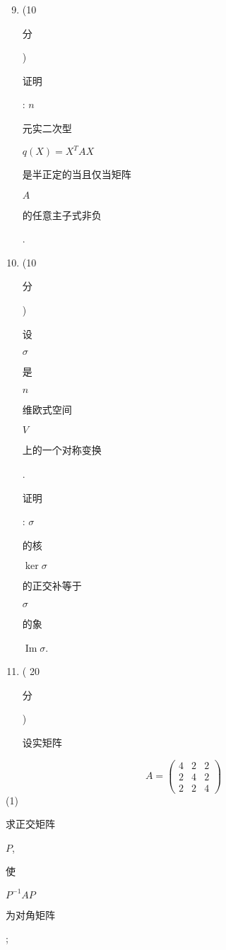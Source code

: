 \documentclass[10pt]{article}
\begin{document}
\begin{enumerate}
  \setcounter{enumi}{8}
  \item (10 \begin{CJK}{UTF8}{mj}分\end{CJK}) \begin{CJK}{UTF8}{mj}证明\end{CJK}: $n$ \begin{CJK}{UTF8}{mj}元实二次型\end{CJK} $q(X)=X^{T} A X$ \begin{CJK}{UTF8}{mj}是半正定的当且仅当矩阵\end{CJK} $A$ \begin{CJK}{UTF8}{mj}的任意主子式非负\end{CJK}.

  \item (10 \begin{CJK}{UTF8}{mj}分\end{CJK}) \begin{CJK}{UTF8}{mj}设\end{CJK} $\sigma$ \begin{CJK}{UTF8}{mj}是\end{CJK} $n$ \begin{CJK}{UTF8}{mj}维欧式空间\end{CJK} $V$ \begin{CJK}{UTF8}{mj}上的一个对称变换\end{CJK}. \begin{CJK}{UTF8}{mj}证明\end{CJK}: $\sigma$ \begin{CJK}{UTF8}{mj}的核\end{CJK} $\operatorname{ker} \sigma$ \begin{CJK}{UTF8}{mj}的正交补等于\end{CJK} $\sigma$ \begin{CJK}{UTF8}{mj}的象\end{CJK} $\operatorname{Im} \sigma$.

  \item ( 20 \begin{CJK}{UTF8}{mj}分\end{CJK}) \begin{CJK}{UTF8}{mj}设实矩阵\end{CJK}

\end{enumerate}
$$
A=\left(\begin{array}{lll}
4 & 2 & 2 \\
2 & 4 & 2 \\
2 & 2 & 4
\end{array}\right)
$$
(1) \begin{CJK}{UTF8}{mj}求正交矩阵\end{CJK} $P$, \begin{CJK}{UTF8}{mj}使\end{CJK} $P^{-1} A P$ \begin{CJK}{UTF8}{mj}为对角矩阵\end{CJK};
\end{document}
